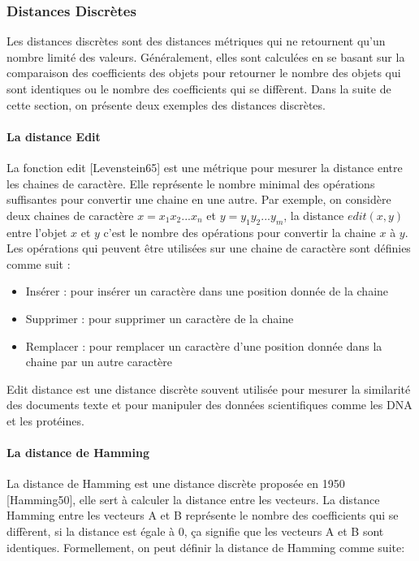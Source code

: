 \subsubsection{Distances Discrètes}
Les distances discrètes sont des distances métriques qui ne retournent qu’un nombre limité des valeurs. Généralement, elles sont calculées en se basant sur la comparaison des coefficients des objets pour retourner le nombre des objets qui sont identiques ou le nombre des coefficients qui se diffèrent. Dans la suite de cette section, on présente deux exemples des distances discrètes.

\paragraph{La distance Edit}
La fonction edit [Levenstein65] est une métrique pour mesurer la distance entre les chaines de caractère. Elle représente le nombre minimal des opérations suffisantes pour convertir une chaine en une autre. Par exemple, on considère deux chaines de caractère $x=x_1x_2...x_n$ et $y=y_1y_2...y_m$, la distance $edit(x,y)$ entre l’objet $x$ et $y$ c’est le nombre des opérations pour convertir la chaine $x$ à $y$. Les opérations qui peuvent être utilisées sur une chaine de caractère sont définies comme suit :
\begin{itemize}
	\item Insérer : pour insérer un caractère dans une position donnée de la chaine
	\item Supprimer : pour supprimer un caractère de la chaine
	\item Remplacer : pour remplacer un caractère d’une position donnée dans la chaine par un autre caractère
\end{itemize}
Edit distance est une distance discrète souvent utilisée pour mesurer la similarité des documents texte et pour manipuler des données scientifiques comme les DNA et les protéines.

\paragraph{La distance de Hamming}
La distance de Hamming est une distance discrète proposée en 1950 [Hamming50], elle sert à calculer la distance entre les vecteurs. La distance Hamming entre les vecteurs A et B représente le nombre des coefficients qui se diffèrent, si la distance est égale à 0, ça signifie que les vecteurs A et B sont identiques. Formellement, on peut définir la distance de Hamming comme suite:

